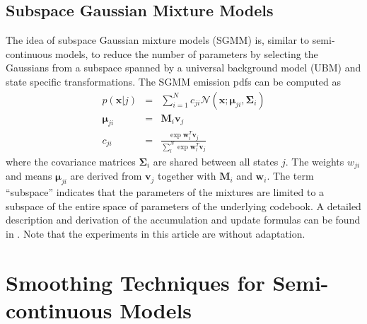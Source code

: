 \documentclass{article}
\def \x{{\mathbf x}}
\def \v{{\mathbf v}}
\def \w{{\mathbf w}}
\def \M{{\mathbf M}}
\def \m{{\bm \mu}}
\def \k{{\mathbf \Sigma}}
\def \nv{{\mathcal N}}
\begin{document}
\subsection{Subspace Gaussian Mixture Models}
The idea of subspace Gaussian mixture models (SGMM) is, similar to 
semi-continuous models, to reduce the number of parameters by selecting the
Gaussians from a subspace spanned by a universal background model (UBM)
and state specific transformations.   The SGMM emission pdfs can
be computed as
\begin{eqnarray}
p(\x | j) & = & \sum_{i=1}^{N} c_{ji} \nv(\x; \m_{ji}, \k_i) \\
\m_{ji}    & = & \M_i \v_j \\
c_{ji}     & = & \frac{\exp \w_i^T \v_j}{\sum_l^N \exp \w_l^T \v_j}
\end{eqnarray}
where the covariance matrices $\k_i$ are shared between all states $j$. The
weights $w_{ji}$ and means $\m_{ji}$ are derived from $\v_j$ together with
$\M_i$ and $\w_i$. The term ``subspace'' indicates that the parameters of the
mixtures are limited to a subspace of the entire space of parameters of
the underlying codebook.
%
A detailed description and derivation of the accumulation and update formulas
can be found in \cite{povey2011sgm}. Note that the experiments in this article
are without adaptation.

\section{Smoothing Techniques for Semi-continuous Models}
\label{sec:smooth}
%
\end{document}
